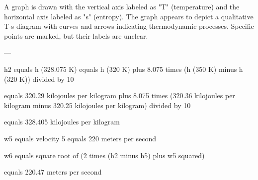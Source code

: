 A graph is drawn with the vertical axis labeled as "T" (temperature) and the horizontal axis labeled as "s" (entropy). The graph appears to depict a qualitative T-s diagram with curves and arrows indicating thermodynamic processes. Specific points are marked, but their labels are unclear.

---

h2 equals h (328.075 K)  
equals h (320 K) plus 8.075 times (h (350 K) minus h (320 K)) divided by 10  

equals 320.29 kilojoules per kilogram plus 8.075 times (320.36 kilojoules per kilogram minus 320.25 kilojoules per kilogram) divided by 10  

equals 328.405 kilojoules per kilogram  

w5 equals velocity 5 equals 220 meters per second  

w6 equals square root of (2 times (h2 minus h5) plus w5 squared)  

equals 220.47 meters per second